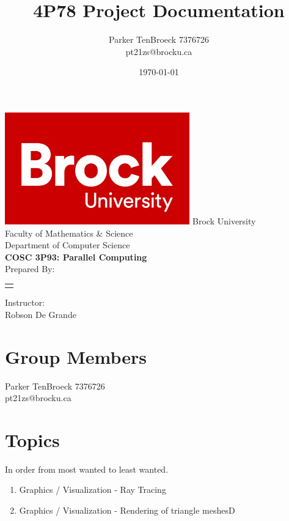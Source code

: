 \documentclass[12pt]{article}
\begin{document}
\title{4P78 Project Documentation}
\author{
    Parker TenBroeck 7376726\\
    pt21zs@brocku.ca
}
\date{\today}

\makeatletter
\begin{titlepage}
	\def \LOGOPATH {brock.jpg}
	\def \UNIVERSITY {Brock University}
	\def \FACULTY {Faculty of Mathematics \& Science}
	\def \DEPARTMENT {Department of Computer Science}
	\def \COURSETITLE {COSC 3P93: Parallel Computing}
	\def \SUPERVISOR {Robson De Grande}
	
	
	\vfill
	\begin{center}
		\includegraphics[width=0.6\textwidth]{brock.jpg}
		\fontsize{14pt}{14pt}\selectfont
		\vfill
		\UNIVERSITY \\
		\FACULTY \\
		\DEPARTMENT \\
		\vfill
		\fontsize{18pt}{18pt}\selectfont
		\textbf{\COURSETITLE} \\[0.5cm]
		\textbf{\@title}
		\vfill
		\fontsize{14pt}{14pt}\selectfont
		Prepared By: \\[0.5cm]
		
		\begin{tabular}[t]{c}
			\@author
		\end{tabular}\par
	
	    \vfill
		Instructor: \\
		\SUPERVISOR
		\vfill
		\@date
	\end{center}
\end{titlepage}
\makeatother

\newpage

\section{Group Members}
Parker TenBroeck 7376726\\
pt21zs@brocku.ca


\section{Topics}

In order from most wanted to least wanted.

\begin{enumerate}
\item Graphics / Visualization - Ray Tracing
\item Graphics / Visualization - Rendering of triangle meshesD
\end{enumerate}


%
%
\end{document}
